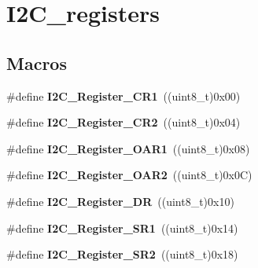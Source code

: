 \hypertarget{group___i2_c__registers}{}\section{I2\+C\+\_\+registers}
\label{group___i2_c__registers}
\subsection*{Macros}
\begin{DoxyCompactItemize}
\item 
\hypertarget{group___i2_c__registers_ga4b9e7934e490c3540e50cf2f1d0a7688}{}\#define {\bfseries I2\+C\+\_\+\+Register\+\_\+\+C\+R1}~((uint8\+\_\+t)0x00)\label{group___i2_c__registers_ga4b9e7934e490c3540e50cf2f1d0a7688}

\item 
\hypertarget{group___i2_c__registers_gaf278337dd03b6ae56eac3f335381eca3}{}\#define {\bfseries I2\+C\+\_\+\+Register\+\_\+\+C\+R2}~((uint8\+\_\+t)0x04)\label{group___i2_c__registers_gaf278337dd03b6ae56eac3f335381eca3}

\item 
\hypertarget{group___i2_c__registers_ga706317a00c0d450e95c00efd2afe1836}{}\#define {\bfseries I2\+C\+\_\+\+Register\+\_\+\+O\+A\+R1}~((uint8\+\_\+t)0x08)\label{group___i2_c__registers_ga706317a00c0d450e95c00efd2afe1836}

\item 
\hypertarget{group___i2_c__registers_gaffdc1902493456dea95216a39fc54e2b}{}\#define {\bfseries I2\+C\+\_\+\+Register\+\_\+\+O\+A\+R2}~((uint8\+\_\+t)0x0\+C)\label{group___i2_c__registers_gaffdc1902493456dea95216a39fc54e2b}

\item 
\hypertarget{group___i2_c__registers_gaea281721e7a8461d90bf59898487c096}{}\#define {\bfseries I2\+C\+\_\+\+Register\+\_\+\+D\+R}~((uint8\+\_\+t)0x10)\label{group___i2_c__registers_gaea281721e7a8461d90bf59898487c096}

\item 
\hypertarget{group___i2_c__registers_gaf3bc5f4dc87513e2eceba4f503c14d6a}{}\#define {\bfseries I2\+C\+\_\+\+Register\+\_\+\+S\+R1}~((uint8\+\_\+t)0x14)\label{group___i2_c__registers_gaf3bc5f4dc87513e2eceba4f503c14d6a}

\item 
\hypertarget{group___i2_c__registers_ga0b5f7949e449223ec97e0169d79d007d}{}\#define {\bfseries I2\+C\+\_\+\+Register\+\_\+\+S\+R2}~((uint8\+\_\+t)0x18)\label{group___i2_c__registers_ga0b5f7949e449223ec97e0169d79d007d}


\end{DoxyCompactItemize}
